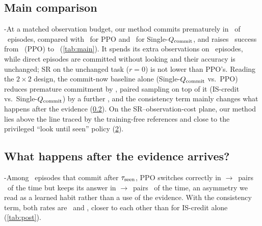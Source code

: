 \begin{figure}[!t]
  \centering
  \caption{}
  \label{fig:curves}
\end{figure}

\subsection{Main comparison}
\label{sec:res-main}
\hyp{At a matched observation budget, our method commits prematurely in \tbd\ of \Look\ episodes, compared with \tbd\ for PPO and \tbd\ for Single-$Q_{\mathrm{commit}}$, and raises \Look\ success from \tbd\ (PPO) to \tbd\ (\cref{tab:main}).
It spends its extra observations on \Look\ episodes, while direct episodes are committed without looking and their accuracy is unchanged; SR on the unchanged task ($r = 0$) is not lower than PPO's.
Reading the $2{\times}2$ design, the commit-now baseline alone (Single-$Q_{\mathrm{commit}}$ vs.\ PPO) reduces premature commitment by \tbd, paired sampling on top of it (IS-credit vs.\ Single-$Q_{\mathrm{commit}}$) by a further \tbd, and the consistency term mainly changes what happens after the evidence (\cref{sec:res-post}).
On the SR--observation-cost plane, our method lies above the line traced by the training-free references and close to the privileged ``look until seen'' policy (\cref{fig:sr-cost}).}


\begin{figure}[!t]
  \centering
  \caption{}
  \label{fig:sr-cost}
\end{figure}

\subsection{What happens after the evidence arrives?}
\label{sec:res-post}
\hyp{Among \Look\ episodes that commit after $\tau_{\mathrm{seen}}$, PPO switches correctly in \Look$\to$\Flip\ pairs \tbd\ of the time but keeps its answer in \Look$\to$\Stay\ pairs \tbd\ of the time, an asymmetry we read as a learned habit rather than a use of the evidence.
With the consistency term, both rates are \tbd\ and \tbd, closer to each other than for IS-credit alone (\cref{tab:post}).}


